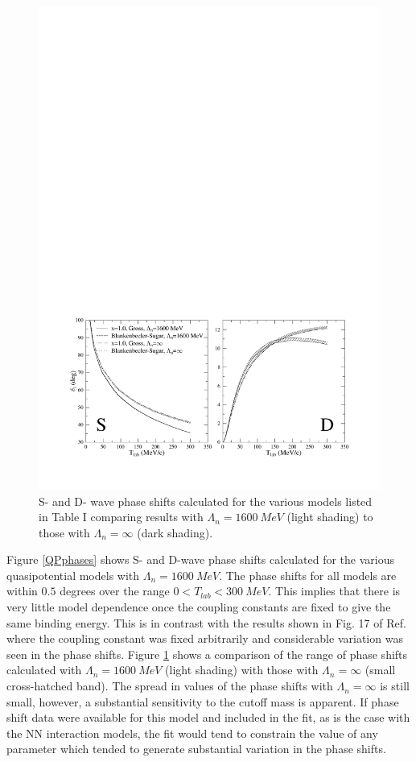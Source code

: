 \documentclass[mythesis.tex]{subfiles}
\begin{document}
\begin{figure}
\centerline{\includegraphics[width=5.5in]{graphics/phase_coup_infty.pdf}}
\caption{S- and D- wave phase shifts calculated for the various
models listed in Table I comparing results with
$\Lambda_n=1600~MeV$ (light shading) to those with
$\Lambda_n=\infty$ (dark shading). }\label{QPphasesI}
\end{figure}


Figure \ref{QPphases} shows S- and D-wave phase shifts calculated for the
various quasipotential models with $\Lambda_n=1600~MeV$. The
phase shifts for all models are within $0.5$ degrees over the range
$0 < T_{lab}<300~MeV$. This implies that there is very little model
dependence once the coupling constants are fixed to give the same binding
energy. This is in contrast with the results shown in Fig. 17 of Ref.
\cite{BrownandJ} where the coupling constant was fixed arbitrarily and
considerable
variation was seen in the phase shifts. Figure \ref{QPphasesI} shows a
comparison of the range of phase shifts calculated with $\Lambda_n=1600~MeV$
(light shading) with those with $\Lambda_n=\infty$ (small
cross-hatched band). The spread in values of the phase shifts with
$\Lambda_n=\infty$ is still small, however, a substantial sensitivity to
the cutoff mass is apparent. If phase shift data were available for this
model and included in the fit, as is the case with the NN interaction
models, the fit would tend to constrain the value of any parameter which
tended to generate substantial variation in the phase shifts.
\end{document}

